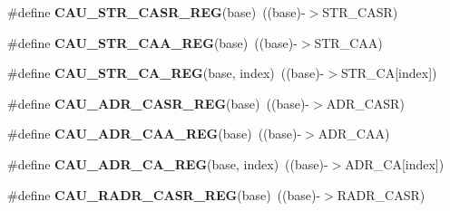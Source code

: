 \begin{DoxyCompactItemize}
\item 
\#define {\bfseries C\+A\+U\+\_\+\+S\+T\+R\+\_\+\+C\+A\+S\+R\+\_\+\+R\+EG}(base)~((base)-\/$>$S\+T\+R\+\_\+\+C\+A\+SR)\hypertarget{group__CAU__Register__Accessor__Macros_gab82f8d15e353c9d00fe1268b550932cf}{}\label{group__CAU__Register__Accessor__Macros_gab82f8d15e353c9d00fe1268b550932cf}

\item 
\#define {\bfseries C\+A\+U\+\_\+\+S\+T\+R\+\_\+\+C\+A\+A\+\_\+\+R\+EG}(base)~((base)-\/$>$S\+T\+R\+\_\+\+C\+AA)\hypertarget{group__CAU__Register__Accessor__Macros_ga14c1d13dc797abdc0a5d161637b1925c}{}\label{group__CAU__Register__Accessor__Macros_ga14c1d13dc797abdc0a5d161637b1925c}

\item 
\#define {\bfseries C\+A\+U\+\_\+\+S\+T\+R\+\_\+\+C\+A\+\_\+\+R\+EG}(base,  index)~((base)-\/$>$S\+T\+R\+\_\+\+CA\mbox{[}index\mbox{]})\hypertarget{group__CAU__Register__Accessor__Macros_gac54278fdd16f81e6ea3076e1ccee6a06}{}\label{group__CAU__Register__Accessor__Macros_gac54278fdd16f81e6ea3076e1ccee6a06}

\item 
\#define {\bfseries C\+A\+U\+\_\+\+A\+D\+R\+\_\+\+C\+A\+S\+R\+\_\+\+R\+EG}(base)~((base)-\/$>$A\+D\+R\+\_\+\+C\+A\+SR)\hypertarget{group__CAU__Register__Accessor__Macros_gaca8728a795c07ab4c7cfd4869205d2d8}{}\label{group__CAU__Register__Accessor__Macros_gaca8728a795c07ab4c7cfd4869205d2d8}

\item 
\#define {\bfseries C\+A\+U\+\_\+\+A\+D\+R\+\_\+\+C\+A\+A\+\_\+\+R\+EG}(base)~((base)-\/$>$A\+D\+R\+\_\+\+C\+AA)\hypertarget{group__CAU__Register__Accessor__Macros_ga8e185ad0d7eab25dd0df422fd599d4c2}{}\label{group__CAU__Register__Accessor__Macros_ga8e185ad0d7eab25dd0df422fd599d4c2}

\item 
\#define {\bfseries C\+A\+U\+\_\+\+A\+D\+R\+\_\+\+C\+A\+\_\+\+R\+EG}(base,  index)~((base)-\/$>$A\+D\+R\+\_\+\+CA\mbox{[}index\mbox{]})\hypertarget{group__CAU__Register__Accessor__Macros_ga542aba52278f577bc565922ed1f224b1}{}\label{group__CAU__Register__Accessor__Macros_ga542aba52278f577bc565922ed1f224b1}

\item 
\#define {\bfseries C\+A\+U\+\_\+\+R\+A\+D\+R\+\_\+\+C\+A\+S\+R\+\_\+\+R\+EG}(base)~((base)-\/$>$R\+A\+D\+R\+\_\+\+C\+A\+SR)\hypertarget{group__CAU__Register__Accessor__Macros_ga731266a8fde87bf322beceb4106ef553}{}\label{group__CAU__Register__Accessor__Macros_ga731266a8fde87bf322beceb4106ef553}


\end{DoxyCompactItemize}

